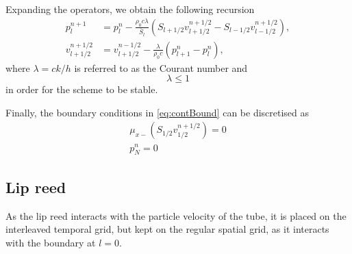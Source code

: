Expanding the operators, we obtain the following recursion
\begin{subequations}\label{eq:updateNormal}
    \begin{align}
        p_l^{n+1} &= p_l^n - \frac{\rho_0 c \lambda}{\bar{S}_l}(S_{l+1/2}v_{l+1/2}^{n+1/2}-S_{l-1/2}v_{l-1/2}^{n+1/2}),\label{eq:pressureUpdate}\\
        v_{l+1/2}^{n+1/2} &= v_{l+1/2}^{n-1/2}-\frac{\lambda}{\rho_0 c}(p_{l+1}^n - p_l^n),\label{eq:velocityUpdate}
    \end{align}
\end{subequations}
where $\lambda = ck/h$ is referred to as the Courant number and
\begin{equation}\label{eq:CFL}
    \lambda \leq 1
\end{equation}
in order for the scheme to be stable. 

Finally, the boundary conditions in \eqref{eq:contBound} can be discretised as
\begin{subequations}
    \begin{align}
        \mu_{x-}\left(S_{1/2}v_{1/2}^{n+1/2}\right) = 0\label{eq:discNeumann}\\
        p_N^n = 0\label{eq:discDirich}
    \end{align}    
\end{subequations}

\subsection{Lip reed}
As the lip reed interacts with the particle velocity of the tube, it is placed on the interleaved temporal grid, but kept on the regular spatial grid, as it interacts with the boundary at $l=0$.

